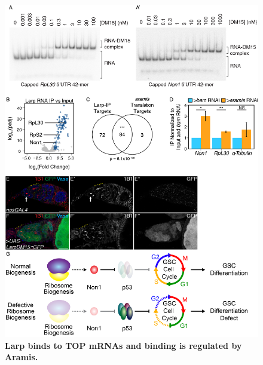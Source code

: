 \documentclass[12pt,oneside]{reedthesis}
\begin{document}
\begin{figure}

{\centering \includegraphics[width=6.5 in,height=8.9375 in]{./figure/Ribosome Biogenesis/Ribosome Biogenesis 7} 

}

\caption[\textbf{Larp binds to TOP mRNAs and binding is regulated by Aramis.}]{\textbf{Larp binds to TOP mRNAs and binding is regulated by Aramis.}}\label{fig:unnamed-chunk-18}
\end{figure}
\end{document}
